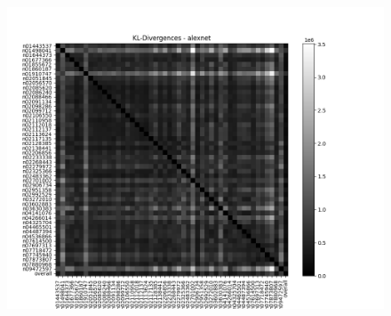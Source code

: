\documentclass{article}
\begin{document}
    \begin{figure}[H]
        \centering
        \begin{minipage}{0.45\textwidth}
            \centering
            \includegraphics[width=\textwidth]{images/alexnet_kl_matrix_untrained_imgr.png} %
            

\end{minipage}
\end{figure}
\end{document}
